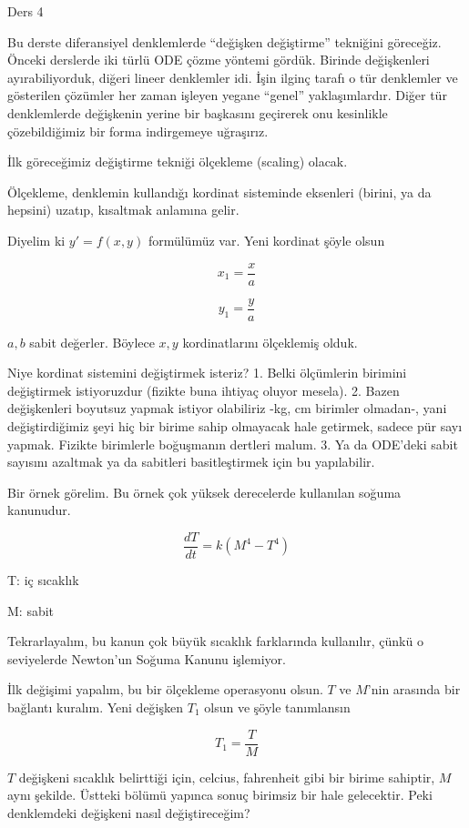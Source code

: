 \documentclass[12pt,fleqn]{article}\usepackage{../../common}
\begin{document}
Ders 4

Bu derste diferansiyel denklemlerde ``değişken değiştirme'' tekniğini
göreceğiz. Önceki derslerde iki türlü ODE çözme yöntemi gördük. Birinde
değişkenleri ayırabiliyorduk, diğeri lineer denklemler idi. İşin ilginç
tarafı o tür denklemler ve gösterilen çözümler her zaman işleyen yegane
``genel'' yaklaşımlardır. Diğer tür denklemlerde değişkenin yerine bir
başkasını geçirerek onu kesinlikle çözebildiğimiz bir forma indirgemeye
uğraşırız.

İlk göreceğimiz değiştirme tekniği ölçekleme (scaling) olacak. 

Ölçekleme, denklemin kullandığı kordinat sisteminde eksenleri (birini,
ya da hepsini) uzatıp, kısaltmak anlamına gelir.

Diyelim ki $y' = f(x,y)$ formülümüz var. Yeni kordinat şöyle olsun

$$ x_1 = \frac{x}{a} $$

$$ y_1 = \frac{y}{a} $$

$a,b$ sabit değerler. Böylece $x,y$ kordinatlarını ölçeklemiş olduk.

Niye kordinat sistemini değiştirmek isteriz? 1. Belki ölçümlerin birimini
değiştirmek istiyoruzdur (fizikte buna ihtiyaç oluyor mesela). 2. Bazen
değişkenleri boyutsuz yapmak istiyor olabiliriz -kg, cm birimler olmadan-,
yani değiştirdiğimiz şeyi hiç bir birime sahip olmayacak hale getirmek,
sadece pür sayı yapmak. Fizikte birimlerle boğuşmanın dertleri malum. 3. Ya
da ODE'deki sabit sayısını azaltmak ya da sabitleri basitleştirmek için bu
yapılabilir.

Bir örnek görelim. Bu örnek çok yüksek derecelerde kullanılan
soğuma kanunudur. 

$$ \frac{dT}{dt} = k(M^4 - T^4) $$

T: iç sıcaklık

M: sabit

Tekrarlayalım, bu kanun çok büyük sıcaklık farklarında kullanılır, çünkü o
seviyelerde Newton'un Soğuma Kanunu işlemiyor.

İlk değişimi yapalım, bu bir ölçekleme operasyonu olsun. $T$ ve $M$'nin
arasında bir bağlantı kuralım. Yeni değişken $T_1$ olsun ve şöyle
tanımlansın

$$ T_1 = \frac{T}{M} $$

$T$ değişkeni sıcaklık belirttiği için, celcius, fahrenheit gibi bir birime
sahiptir, $M$ aynı şekilde. Üstteki bölümü yapınca sonuç birimsiz bir hale
gelecektir. Peki denklemdeki değişkeni nasıl değiştireceğim?
\end{document}
